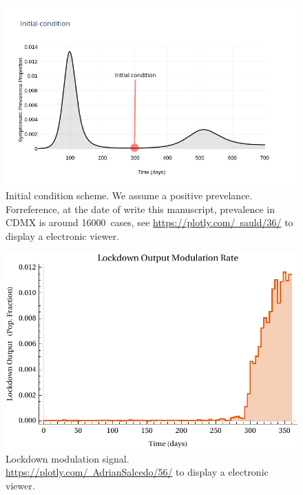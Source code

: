 \begin{figure}
    \centering
    \includegraphics[scale=0.5, keepaspectratio]{figs/InitialCondition}
    \caption[Initial condition]{
        Initial condition scheme. We assume a positive
        prevelance. Forreference, at the date of write this manuscript,
        prevalence in CDMX is
        around \SI{16000}{cases}, see
        \href{https://plotly.com/~sauld/36/}{https://plotly.com/~sauld/36/}
        to display a electronic viewer.}
        \label{fig:initialcondition}
\end{figure}

\begin{figure}[tbh]
    \centering
    \includegraphics[width=0.7\linewidth]{figs/lockdown_control_signal}
    \caption[Lockdown modulation signal.]{Lockdown modulation signal.
    \href{https://plotly.com/~AdrianSalcedo/56/}
    {https://plotly.com/~AdrianSalcedo/56/}
            to display a electronic viewer.}
    \label{fig:lockdowncontrolsignal}
\end{figure}

